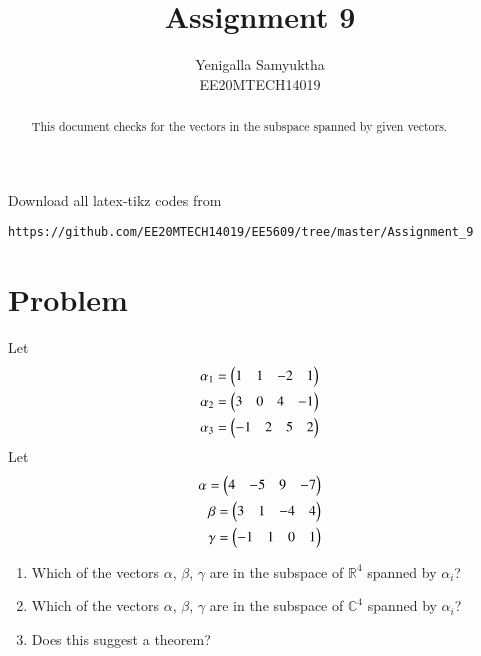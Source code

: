 \documentclass[journal,12pt,twocolumn]{IEEEtran}
\begin{document}
     \def\rightbox#1{\makebox[0in][r]{#1}}
     \def\centbox#1{\makebox[0in]{#1}}
     \def\topbox#1{\raisebox{-\baselineskip}[0in][0in]{#1}}
     \def\midbox#1{\raisebox{-0.5\baselineskip}[0in][0in]{#1}}
\vspace{3cm}
\title{Assignment 9}
\author{Yenigalla Samyuktha\\EE20MTECH14019}
\maketitle
\newpage
\bigskip
\renewcommand{\thefigure}{\theenumi}
\renewcommand{\thetable}{\theenumi}
\begin{abstract}
This document checks for the vectors in the subspace spanned by given vectors.
\end{abstract}
Download all latex-tikz codes from 
%
\begin{lstlisting}
https://github.com/EE20MTECH14019/EE5609/tree/master/Assignment_9
\end{lstlisting}
%
\section{Problem}
Let
\begin{align} 
\alpha_1=\begin{pmatrix}1&1&-2&1\end{pmatrix} \\
\alpha_2=\begin{pmatrix}3&0&4&-1\end{pmatrix} \\
\alpha_3=\begin{pmatrix}-1&2&5&2\end{pmatrix}
\end{align}
Let
\begin{align}
\alpha=\begin{pmatrix}4&-5&9&-7\end{pmatrix} \\
\beta=\begin{pmatrix}3&1&-4&4\end{pmatrix} \\
\gamma=\begin{pmatrix}-1&1&0&1\end{pmatrix}
\end{align}
\begin{enumerate}
\item Which of the vectors $\alpha$, $\beta$, $\gamma$ are in the subspace of $\mathbb{R}^4$ spanned by $\alpha_i$?
\item Which of the vectors $\alpha$, $\beta$, $\gamma$ are in the subspace of $\mathbb{C}^4$ spanned by $\alpha_i$?
\item Does this suggest a theorem?
\end{enumerate}
\end{document}
